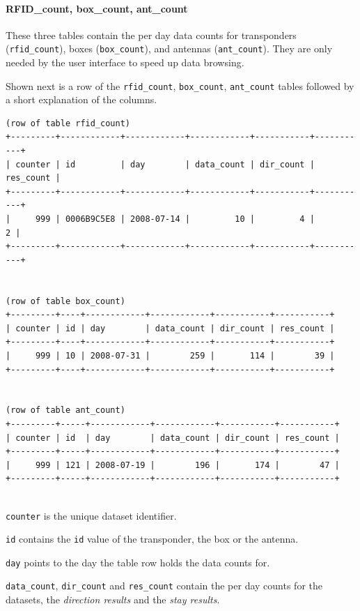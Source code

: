 \paragraph{RFID\_count, box\_count, ant\_count}
\label{para:counts}

These three tables contain the per day data counts for transponders (\lstinline|rfid_count|), boxes (\lstinline|box_count|), and antennas (\lstinline|ant_count|). They are only needed by the user interface to speed up data browsing.

Shown next is a row of the \lstinline|rfid_count|, \lstinline|box_count|, \lstinline|ant_count| tables followed by a short explanation of the columns.

\codescript
{}
\begin{lstlisting}[frame=none]
(row of table rfid_count)
+---------+------------+------------+------------+-----------+-----------+
| counter | id         | day        | data_count | dir_count | res_count |
+---------+------------+------------+------------+-----------+-----------+
|     999 | 0006B9C5E8 | 2008-07-14 |         10 |         4 |         2 | 
+---------+------------+------------+------------+-----------+-----------+


(row of table box_count)
+---------+----+------------+------------+-----------+-----------+
| counter | id | day        | data_count | dir_count | res_count |
+---------+----+------------+------------+-----------+-----------+
|     999 | 10 | 2008-07-31 |        259 |       114 |        39 | 
+---------+----+------------+------------+-----------+-----------+


(row of table ant_count)
+---------+-----+------------+------------+-----------+-----------+
| counter | id  | day        | data_count | dir_count | res_count |
+---------+-----+------------+------------+-----------+-----------+
|     999 | 121 | 2008-07-19 |        196 |       174 |        47 | 
+---------+-----+------------+------------+-----------+-----------+


\end{lstlisting}

\begin{mydesc}
\item \lstinline|counter| is the unique dataset identifier.
\item \lstinline|id| contains the \lstinline|id| value of the transponder, the box or the antenna.
\item \lstinline|day| points to the day the table row holds the data counts for.
\item \lstinline|data_count|, \lstinline|dir_count| and \lstinline|res_count| contain the per day counts for the datasets, the \textit{direction results} and the \textit{stay results}.
\end{mydesc}

